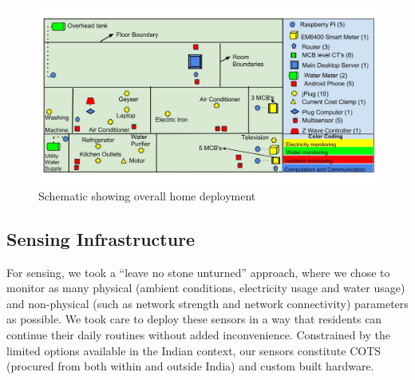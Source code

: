 \documentclass[10pt]{sensys-proc}
\begin{document}
\begin{figure} 
	\vspace{-4mm}    
    \includegraphics[scale=0.19]{./figures/overall_deployment.jpg}
    \vspace{-10mm}    
    \caption{Schematic showing overall home deployment} 
    \vspace{-2mm}  
    \label{fig:overall}
\end{figure}

\subsection{Sensing Infrastructure}
\label{sec:sensing}
For sensing, we took a ``leave no stone unturned'' approach, where  we chose to monitor as many physical (ambient conditions, electricity usage and water usage) and non-physical (such as network strength and network connectivity) parameters as possible. We took care to deploy these sensors in a way that residents can continue their daily routines without added inconvenience. Constrained by the limited options available in the Indian context, our sensors constitute COTS (procured from both within and outside India) and custom built hardware. %
\end{document}

